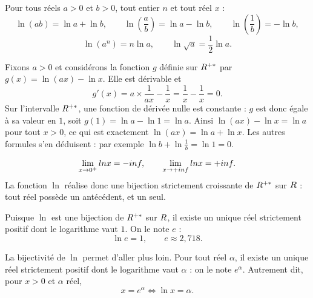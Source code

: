 \begin{theoreme}
Pour tous réels $a>0$ et $b>0$, tout entier $n$ et tout réel $x$ :
\[
  \ln(ab) = \ln a + \ln b, \qquad
  \ln\!\left(\frac{a}{b}\right) = \ln a - \ln b, \qquad
  \ln\!\left(\frac{1}{b}\right) = -\ln b,
\]
\[
  \ln\left(a^{n}\right) = n\ln a, \qquad
  \ln\sqrt{a} = \frac{1}{2}\ln a .
\]
\end{theoreme}

\begin{demonstration}
Fixons $a>0$ et considérons la fonction $g$ définie sur $R^{+*}$ par
$g(x) = \ln(ax) - \ln x$. Elle est dérivable et
\[
  g'(x) = a \times \frac{1}{ax} - \frac{1}{x} = \frac{1}{x} - \frac{1}{x} = 0 .
\]
Sur l'intervalle $R^{+*}$, une fonction de dérivée nulle est constante : $g$ est
donc égale à sa valeur en $1$, soit $g(1) = \ln a - \ln 1 = \ln a$. Ainsi
$\ln(ax) - \ln x = \ln a$ pour tout $x>0$, ce qui est exactement
$\ln(ax) = \ln a + \ln x$. Les autres formules s'en déduisent : par exemple
$\ln b + \ln\frac1b = \ln 1 = 0$.
\end{demonstration}


\begin{propriete}
\[
  \lim_{x \to 0^{+}} \ln x = -\infty, \qquad \limpinf \ln x = +\infty .
\]
La fonction $\ln$ réalise donc une bijection strictement croissante de $R^{+*}$
sur $R$ : tout réel possède un antécédent, et un seul.
\end{propriete}

\begin{definition}[le nombre $e$]
Puisque $\ln$ est une bijection de $R^{+*}$ sur $R$, il existe un unique réel
strictement positif dont le logarithme vaut $1$. On le note $e$ :
\[
  \ln e = 1, \qquad e \approx 2{,}718 .
\]
\end{definition}

\begin{definition}
La bijectivité de $\ln$ permet d'aller plus loin. Pour tout réel $\alpha$, il
existe un unique réel strictement positif dont le logarithme vaut $\alpha$ :
on le note $e^{\alpha}$. Autrement dit, pour $x>0$ et $\alpha$ réel,
\[
  x = e^{\alpha} \iff \ln x = \alpha .
\]
\end{definition}

